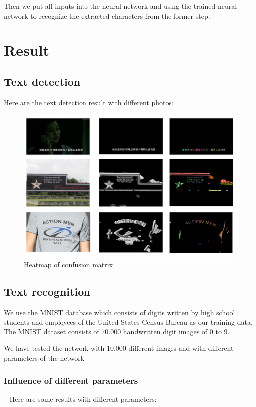 \documentclass[paper=a4, french, 11pt]{scrartcl}
\begin{document}
Then we put all inputs into the neural network and using the trained neural network to recognize the extracted characters from the former step.

\section{Result}

\subsection{Text detection}
Here are the text detection result with different photos:

\begin{figure}[h]
\begin{center}
   \includegraphics[width=1.0\linewidth]{results.png}
\end{center}
\vspace{-3ex}
\caption{Heatmap of confusion matrix}
\label{fig:heatmap}
\end{figure}

\subsection{Text recognition}
We use the MNIST database which consists of digits written by high school students and employees of the United States Census Bureau as our training data. The MNIST dataset consists of 70.000 handwritten digit images of 0 to 9.

We have tested the network with 10.000 different images and with different parameters of the network.

\subsubsection{Influence of different parameters}
~\indent
Here are some results with different parameters:
\end{document}
